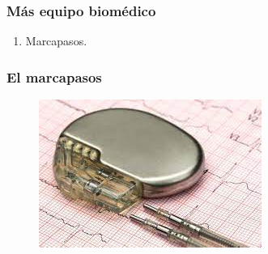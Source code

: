 \documentclass[14pt]{beamer}
\begin{document}
\begin{frame}
\frametitle{Más equipo biomédico}
\begin{enumerate}[<+->]
\conti
\item Marcapasos.
\end{enumerate}
\end{frame}
\begin{frame}
\frametitle{El marcapasos}
\vspace*{-1cm}
\begin{figure}
    \centering
    \includegraphics[scale=0.73]{Imagenes/Instrumentacion_12.jpg}
\end{figure}
\end{frame}
\end{document}
